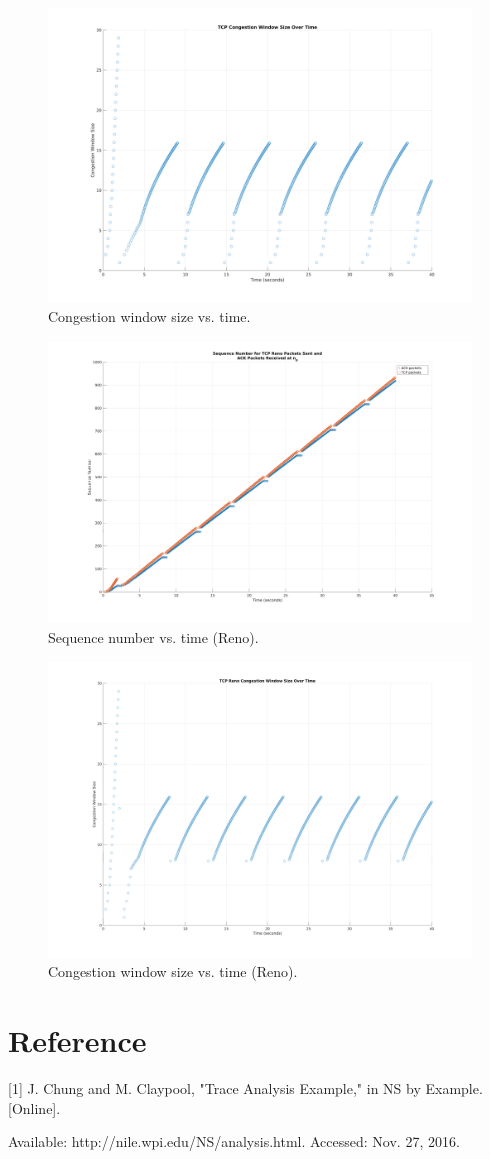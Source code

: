 \documentclass{article}
\begin{document}
	\begin{figure}[!hbt]
		\centering
		\includegraphics[width=0.85\linewidth]{proj2_p2.png}
		\caption{Congestion window size vs. time.}
	\end{figure}

	\begin{figure}[!hbt]
		\centering
		\includegraphics[width=0.85\linewidth]{proj2_p3.png}
		\caption{Sequence number vs. time (Reno).}
	\end{figure}

	\begin{figure}[!hbt]
		\centering
		\includegraphics[width=0.85\linewidth]{proj2_p4.png}
		\caption{Congestion window size vs. time (Reno).}
	\end{figure}

\section*{Reference}

	[1] J. Chung and M. Claypool, "Trace Analysis Example," in NS by Example.
	[Online].

	Available: http://nile.wpi.edu/NS/analysis.html. Accessed: Nov. 27, 2016.
\end{document}
